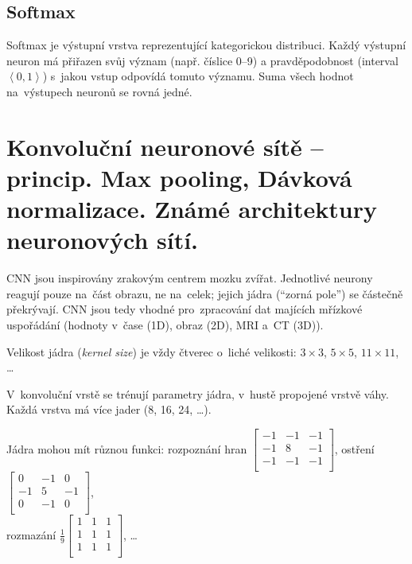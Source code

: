 \subsection{Softmax}

Softmax je výstupní vrstva reprezentující kategorickou distribuci.
Každý výstupní neuron má přiřazen svůj význam (např. číslice 0--9) a pravděpodobnost (interval $\left<0, 1\right>$) s~jakou vstup odpovídá tomuto významu.
Suma všech hodnot na~výstupech neuronů se rovná jedné.

\clearpage
\section{Konvoluční neuronové sítě – princip. Max pooling, Dávková normalizace. Známé architektury neuronových sítí.}

CNN jsou inspirovány zrakovým centrem mozku zvířat.
Jednotlivé neurony reagují pouze na~část obrazu, ne na~celek; jejich jádra (\enquote{zorná pole}) se částečně překrývají.
CNN jsou tedy vhodné pro~zpracování dat majících mřízkové uspořádání (hodnoty v~čase (1D), obraz (2D), MRI a~CT (3D)).

Velikost jádra (\emph{kernel size}) je vždy čtverec o~liché velikosti: $3\times3$, $5 \times 5$, $11 \times 11$, \dots

V~konvoluční vrstě se trénují parametry jádra, v~hustě propojené vrstvě váhy.
Každá vrstva má více jader (8, 16, 24, \dots).

Jádra mohou mít různou funkci:
rozpoznání hran $\left[ \begin{matrix}
-1 & -1 & -1 \\
-1 &  8 & -1 \\
-1 & -1 & -1 \\
\end{matrix} \right]$,
ostření $\left[ \begin{matrix}
 0 & -1 &  0 \\
-1 &  5 & -1 \\
 0 & -1 &  0 \\
\end{matrix} \right]$,
\\
rozmazání $\frac{1}{9} \left[ \begin{matrix}
1 & 1 & 1 \\
1 & 1 & 1 \\
1 & 1 & 1 \\
\end{matrix} \right]$,
\dots

